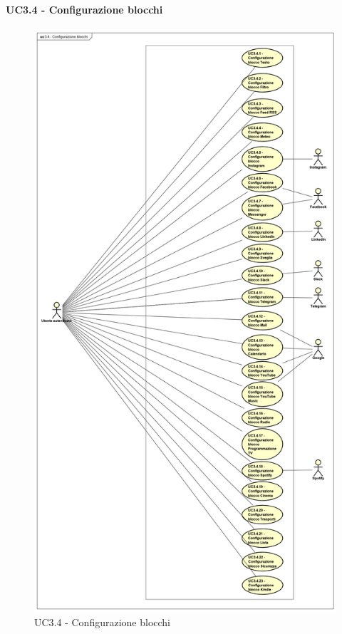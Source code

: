 \paragraph{UC3.4 - Configurazione blocchi}
\begin{figure}[htbp]
\centering
\includegraphics[scale=0.30]{immagini/UC3-4}
\caption{UC3.4 - Configurazione blocchi \label{fig:UC3-4}}
\end{figure}

